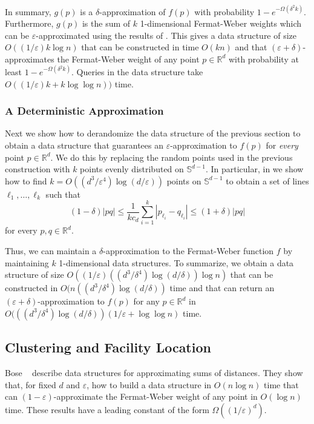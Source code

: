 \documentclass[charterfonts,lotsofwhite]{patmorin}
\newcommand{\eps}{\varepsilon}
\begin{document}
In summary, $g(p)$ is a $\delta$-approximation of $f(p)$ with
probability $1-e^{-\Omega(\delta^2k)}$.  Furthermore, $g(p)$ is the
sum of $k$ 1-dimensional Fermat-Weber weights which can be
$\eps$-approximated using the results of .  This gives a
data structure of size $O((1/\eps)k\log n)$ that can be constructed in
time $O(kn)$ and that $(\eps+\delta)$-approximates the Fermat-Weber
weight of any point $p\in\mathbb{R}^d$ with probability at least
$1-e^{-\Omega(\delta^2k)}$.  Queries in the data structure take
$O((1/\eps)k+k\log\log n))$ time.


\subsubsection{A Deterministic Approximation}

Next we show how to derandomize the data structure of the previous
section to obtain a data structure that guarantees an
$\eps$-approximation to $f(p)$ for \emph{every} point
$p\in\mathbb{R}^d$.  
We do this by replacing the random points used in the previous
construction with 
$k$ points evenly distributed on $\mathbb{S}^{d-1}$.  In particular,
in  we show how to find
$k=O((d^3/\eps^4)\log (d/\eps))$ points on $\mathbb{S}^{d-1}$ 
to obtain a set of lines $\ell_1,\ldots,\ell_k$ such that
\[
      (1-\delta)|pq|\le \frac{1}{kc_d} \sum_{i=1}^k |p_{\ell_i}-q_{\ell_i}| 
      \le (1+\delta)|pq| 
\]
for every $p,q\in\mathbb{R}^d$.

Thus, we can maintain a $\delta$-approximation to the Fermat-Weber
function $f$ by maintaining $k$ 1-dimensional data structures.  To
summarize, we obtain a data structure of size
$O((1/\eps)((d^3/\delta^{4})\log(d/\delta))\log n)$ that can be constructed in
$O(n((d^3/\delta^4)\log(d/\delta))$ time and that can return an
$(\eps+\delta)$-approximation to $f(p)$ for any $p\in\mathbb{R}^d$ in
$O(((d^3/\delta^{4})\log (d/\delta))(1/\eps + \log\log n)$ time.

\subsection{Clustering and Facility Location}

Bose \etal\ \cite{bmm02} describe data structures for approximating
sums of distances.  They show that, for fixed $d$ and $\eps$, how to
build a data structure in $O(n\log n)$ time that can
$(1-\eps)$-approximate the Fermat-Weber weight of any point in $O(\log
n)$ time.  These results have a leading constant of the form
$\Omega((1/\eps)^d)$.
\end{document}
